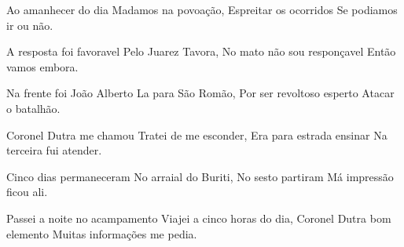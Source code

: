 \documentclass{article}
\begin{document}
\begin{poem}
	\begin{stanza}
    Ao amanhecer do dia    \verseline
    Madamos na povoação,   \verseline
    Espreitar os ocorridos \verseline
    Se podiamos ir ou não.
  \end{stanza}
\end{poem}

\begin{poem}
	\begin{stanza}
    A resposta foi favoravel    \verseline
    Pelo Juarez Tavora,         \verseline
    No mato não sou responçavel \verseline
    Então vamos embora.
  \end{stanza}
\end{poem}

\begin{poem}
	\begin{stanza}
    Na frente foi João Alberto \verseline
    La para São Romão,         \verseline
    Por ser revoltoso esperto  \verseline
    Atacar o batalhão.
  \end{stanza}
\end{poem}

\begin{poem}
	\begin{stanza}
    Coronel Dutra me chamou  \verseline
    Tratei de me esconder,   \verseline
    Era para estrada ensinar \verseline
    Na terceira fui atender.
  \end{stanza}
\end{poem}

\begin{poem}
	\begin{stanza}
	Cinco dias permaneceram \verseline
	No arraial do Buriti,   \verseline
	No sesto partiram       \verseline
	Má impressão ficou ali.
  \end{stanza}
\end{poem}

\begin{poem}
	\begin{stanza}
    Passei a noite no acampamento \verseline
    Viajei a cinco horas do dia,  \verseline
    Coronel Dutra bom elemento    \verseline
    Muitas informações me pedia.
  \end{stanza}
\end{poem}
\end{document}
